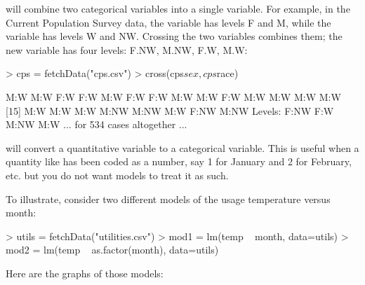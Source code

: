 \begin{description}

\item[\function{cross}] will combine two categorical variables into a single
  variable.  For example, in the Current Population Survey data, the
  variable  has levels F and M, while the variable 
  has levels W and NW.  Crossing the two variables combines them; the
  new variable has four levels: F.NW, M.NW, F.W, M.W:
\begin{Schunk}
\begin{Sinput}
> cps = fetchData("cps.csv")
> cross(cps$sex, cps$race)
\end{Sinput}
\end{Schunk}
\begin{Schunk}
\begin{Soutput}
 [1] M:W  M:W  F:W  F:W  M:W  F:W  F:W  M:W  M:W  F:W  M:W  M:W  M:W  M:W 
[15] M:W  M:W  M:W  M:NW M:NW M:W  F:NW M:NW
Levels: F:NW F:W M:NW M:W
... for 534 cases altogether ...
\end{Soutput}
\end{Schunk}

\item[\function{as.factor}] will convert a quantitative variable to a categorical
  variable.  This is useful when a quantity like  has been
  coded as a number, say 1 for January and 2 for February, etc.
  but you do not want models to treat it as such.

  To illustrate, consider two different models of the usage
  temperature versus month:
\begin{Schunk}
\begin{Sinput}
> utils = fetchData("utilities.csv")
> mod1 = lm(temp ~ month, data=utils)
> mod2 = lm(temp ~ as.factor(month), data=utils)
\end{Sinput}
\end{Schunk}

\datasetUtilities
Here are the graphs of those models:


\end{description}
